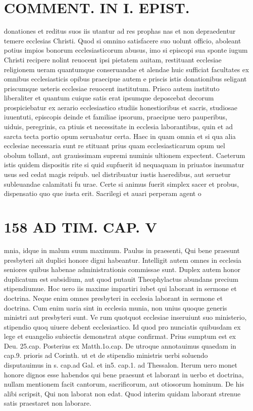 \documentclass{article}
\begin{document}
\begin{pages}
\section*{COMMENT. IN I. EPIST. }\pstart donationes et reditus suos iis utantur ad res prophas nas et non depraedentur temere ecclesias Christi. Quod si omnino satisfacere suo uolunt officio, aboleant potius impios bonorum ecclesiasticorum abusus, imo si episcopi sua sponte iugum Christi recipere nolint reuocent ipsi pietatem auitam, restituant ecclesiae religionem ueram quantumque conseruandae et alendae huic sufficiat facultates ex omnibus ecclesiasticis opibus praecipue autem e priscis istis donationibus seligant priscumque ueteris ecclesiae reuocent institutum. Prisco autem instituto liberaliter et quantum cuique satis erat ipsumque deposcebat decorum prospiciebatur ex aerario ecclesiastico studiis honestioribus et sacris, studiosae iuuentuti, episcopis deinde et familiae ipsorum, praecipue uero pauperibus, uiduis, peregrinis, ca ptiuis et necessitate in ecclesia laborantibus, quin et ad sarcta tecta portio opum seruabatur certa. Haec in quam omnia et si qua alia ecclesiae necessaria sunt re stituant prius quam ecclesiasticarum opum uel obolum tollant, aut grauissimam supremi numinis ultionem expectent. Caeterum istis quidem dispositis rite si quid supfuerit id nequaquam in priuatos insumatur usus sed cedat magis reipub. uel distribuatur iustis haeredibus, aut seruetur subleuandae calamitati fu urae. Certe si animus fuerit simplex sacer et probus, dispensatio quo que iusta erit. Sacrilegi et auari perperam agent o\pend
\section*{158 AD TIM. CAP. V }
\marginpar{[ p.158 ]}\pstart mnia, idque in malum suum maximum. Paulus in praesenti, Qui bene praesunt presbyteri ait duplici honore digni habeantur. Intelligit autem omnes in ecclesia seniores quibus habenae administrationis commissae sunt. Duplex autem honor duplicatum est subsidium, aut quod putauit Theophylactus abundans precium stipendiumue. Hoc uero iis maxime impartiri iubet qui laborant in sermone et doctrina. Neque enim omnes presbyteri in ecclesia laborant in sermone et doctrina. Cum enim uaria sint in ecclesia munia, non unius quoque generis ministri aut presbyteri sunt. Ve rum quotquot ecclesiae inseruiunt suo ministerio, stipendio quoq uiuere debent ecclesiastico. Id quod pro nunciatis quibusdam ex lege et euangelio subiectis demonstrat atque confirmat. Prius sumptum est ex Deu. 25.cap. Posterius ex Matth.1o.cap. De utroque annotauimus quaedam in cap.9. prioris ad Corinth. ut et de stipendio ministris uerbi soluendo disputauimus in s. cap.ad Gal. et in5. cap.1. ad Thessalon. Iterum uero monet honore dignos esse habendos qui bene praesunt et laborant in uerbo et doctrina, nullam mentionem facit cantorum, sacrificorum, aut otiosorum hominum. De his alibi scripsit, Qui non laborat non edat. Quod interim quidam laborant strenue satis praestaret non laborare.  \pend

\end{pages}
\end{document}

